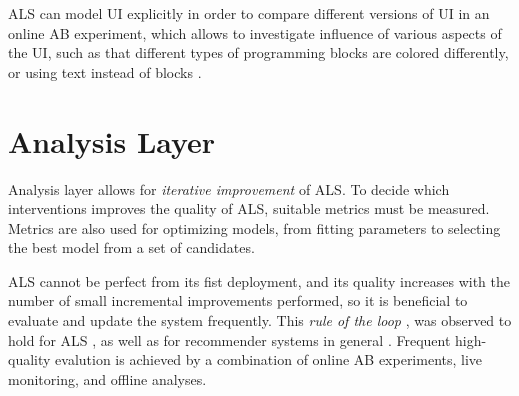 ALS can model UI explicitly in order to compare different versions
of UI in an online AB experiment,
which allows to investigate influence of various aspects of
the UI, such as that different types of programming blocks are colored differently,
or using text instead of blocks %
\cite{comparing-blocks-text-weintrop2017}.


\section{Analysis Layer}
\label{sec:metrics-and-evaluation}



Analysis layer allows for \emph{iterative improvement} of ALS.
To decide which interventions improves the quality of ALS,
  suitable metrics must be measured. %
Metrics are also used for optimizing models,
  from fitting parameters %
  to selecting the best model from a set of candidates.

ALS cannot be perfect from its fist deployment,
and its quality increases with the number of small
incremental improvements performed, so it is beneficial to
evaluate and update the system frequently.
This \emph{rule of the loop} \cite{book-of-lenses},
was observed to hold for ALS \cite[p.124]{its-domain-models, stupid-tutoring-systems-intelligent-humans}, %
as well as for recommender systems in general \cite[][Rule 16]{google-ml-rules}.
Frequent high-quality evalution is achieved by a combination of
  online AB experiments, live monitoring, and offline analyses.

